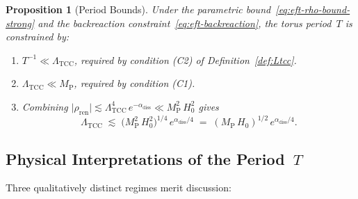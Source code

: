\documentclass[12pt,openany]{book}
\theoremstyle{plain}
\newtheorem{eftproposition}[efttheorem]{Proposition}
\theoremstyle{definition}
\theoremstyle{remark}
\providecommand{\Ltcc}{\Lambda_{\mathrm{TCC}}}
\providecommand{\Mpl}{M_{\mathrm{P}}}
\providecommand{\abs}[1]{\lvert #1 \rvert}
\providecommand{\Ren}{\mathrm{ren}}
\providecommand{\diss}{\mathrm{diss}}
\begin{document}
\begin{eftproposition}[Period Bounds]
\label{prop:T-bounds}
Under the parametric bound~\eqref{eq:eft-rho-bound-strong} and the
backreaction constraint~\eqref{eq:eft-backreaction}, the torus
period~$T$ is constrained by:
\begin{enumerate}
  \item[\textbf{(Lower bound on $T^{-1}$):}]
    $T^{-1} \ll \Ltcc$, required by condition (C2) of
    Definition~\ref{def:Ltcc}.

  \item[\textbf{(Upper bound on $\Ltcc$):}]
    $\Ltcc \ll \Mpl$, required by condition (C1).

  \item[\textbf{(Consistency relation):}]
    Combining $\abs{\rho_{\Ren}} \lesssim \Ltcc^{4}\,e^{-\alpha_{\diss}}
    \ll \Mpl^{2}\,H_{0}^{2}$ gives
    \begin{equation}\label{eq:eft-Ltcc-bound}
      \Ltcc
      \;\lesssim\;
      \bigl(\Mpl^{2}\,H_{0}^{2}\bigr)^{1/4}
        \,e^{\alpha_{\diss}/4}
      \;=\;
      (\Mpl\,H_{0})^{1/2}\,e^{\alpha_{\diss}/4}.
    \end{equation}
\end{enumerate}
\end{eftproposition}

\subsection{Physical Interpretations of the Period~$T$}
\label{sec:eft-T-interp}

Three qualitatively distinct regimes merit discussion:
\end{document}
